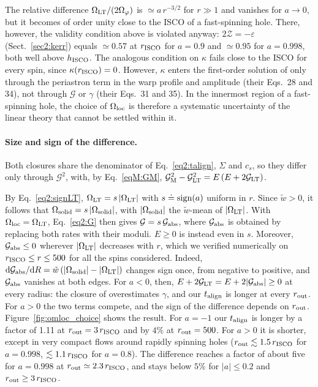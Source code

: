 The relative difference $\Omega_\textup{LT}/(2\Omega_\varphi)$ is $\simeq a\,r^{-3/2}$ for $r\gg1$ and vanishes for $a\to0$, but it becomes of order unity close to the ISCO of a fast-spinning hole.
There, however, the validity condition above is violated anyway: $2\mathcal{Z}=-\varepsilon$ (Sect.~\ref{sec2:kerr}) equals $\simeq0.57$ at $r_\textup{ISCO}$ for $a=0.9$ and $\simeq0.95$ for $a=0.998$, both well above $h_\textup{ISCO}$.
The analogous condition on $\kappa$ fails close to the ISCO for every spin, since $\kappa(r_\textup{ISCO})=0$.
However, $\kappa$ enters the first-order solution of \citet{FoucartLai2014} only through the periastron term in the warp profile and amplitude (their Eqs.~28 and 34), not through $\mathcal{G}$ or $\gamma$ (their Eqs.~31 and 35).
In the innermost region of a fast-spinning hole, the choice of $\Omega_\textup{loc}$ is therefore a systematic uncertainty of the linear theory that cannot be settled within it.

\paragraph{Size and sign of the difference.}
Both closures share the denominator of Eq.~\eqref{eq2:talign}, $\Sigma$ and $c_s$, so they differ only through $\mathcal{G}^2$, with, by Eq.~\eqref{eqM:GM}, $\mathcal{G}_\textup{M}^2-\mathcal{G}_\textup{LT}^2=E\,(E+2\mathcal{G}_\textup{LT})$.

By Eq.~\eqref{eq2:signLT}, $\Omega_\textup{LT}=s\,|\Omega_\textup{LT}|$ with $s\doteq\textup{sign}(a)$ uniform in $r$.
Since $\tilde w>0$, it follows that $\Omega_\textup{solid}=s\,|\Omega_\textup{solid}|$, with $|\Omega_\textup{solid}|$ the $\tilde w$-mean of $|\Omega_\textup{LT}|$.
With $\Omega_\textup{loc}=\Omega_\textup{LT}$, Eq.~\eqref{eq2:G} then gives $\mathcal{G}=s\,\mathcal{G}_\textup{abs}$, where $\mathcal{G}_\textup{abs}$ is obtained by replacing both rates with their moduli.
$E\geq0$ is instead even in $s$.
Moreover, $\mathcal{G}_\textup{abs}\leq0$ wherever $|\Omega_\textup{LT}|$ decreases with $r$, which we verified numerically on $r_\textup{ISCO}\leq r\leq500$ for all the spins considered.
Indeed, $\textup{d}\mathcal{G}_\textup{abs}/\textup{d}R=\tilde w\,(|\Omega_\textup{solid}|-|\Omega_\textup{LT}|)$ changes sign once, from negative to positive, and $\mathcal{G}_\textup{abs}$ vanishes at both edges.
For $a<0$, then, $E+2\mathcal{G}_\textup{LT}=E+2|\mathcal{G}_\textup{abs}|\geq0$ at every radius: the closure of \citet{Motta2017} overestimates $\gamma$, and our $t_\textup{align}$ is longer at every $r_\textup{out}$.
For $a>0$ the two terms compete, and the sign of the difference depends on $r_\textup{out}$.
Figure~\ref{fig:omloc_choice} shows the result.
For $a=-1$ our $t_\textup{align}$ is longer by a factor of 1.11 at $r_\textup{out}=3\,r_\textup{ISCO}$ and by $4\%$ at $r_\textup{out}=500$.
For $a>0$ it is shorter, except in very compact flows around rapidly spinning holes ($r_\textup{out}\lesssim1.5\,r_\textup{ISCO}$ for $a=0.998$, $\lesssim1.1\,r_\textup{ISCO}$ for $a=0.8$).
The difference reaches a factor of about five for $a=0.998$ at $r_\textup{out}\simeq2.3\,r_\textup{ISCO}$, and stays below $5\%$ for $|a|\leq0.2$ and $r_\textup{out}\geq3\,r_\textup{ISCO}$.

